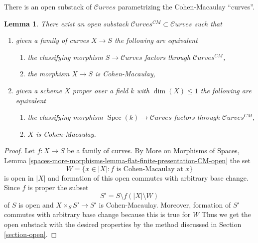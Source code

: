 \documentclass{stacks-project}
\theoremstyle{plain}
\newtheorem{lemma}[subsection]{Lemma}
\theoremstyle{definition}
\theoremstyle{remark}
\numberwithin{equation}{subsection}
\def\Spec{\mathop{\mathrm{Spec}}}
\def\Curvesstack{\mathcal{C}\!\mathit{urves}}
\begin{document}
\noindent
There is an open substack of $\Curvesstack$ parametrizing
the Cohen-Macaulay ``curves''.

\begin{lemma}
\label{lemma-CM-curves}
There exist an open substack $\Curvesstack^{CM} \subset \Curvesstack$
such that
\begin{enumerate}
\item given a family of curves $X \to S$ the following are equivalent
\begin{enumerate}
\item the classifying morphism $S \to \Curvesstack$ factors
through $\Curvesstack^{CM}$,
\item the morphism $X \to S$ is Cohen-Macaulay,
\end{enumerate}
\item given a scheme $X$ proper over a field $k$ with $\dim(X) \leq 1$
the following are equivalent
\begin{enumerate}
\item the classifying morphism $\Spec(k) \to \Curvesstack$ factors
through $\Curvesstack^{CM}$,
\item $X$ is Cohen-Macaulay.
\end{enumerate}
\end{enumerate}
\end{lemma}

\begin{proof}
Let $f : X \to S$ be a family of curves. By
More on Morphisms of Spaces, Lemma
\ref{spaces-more-morphisms-lemma-flat-finite-presentation-CM-open}
the set
$$
W = \{x \in |X| : f \text{ is Cohen-Macaulay at }x\}
$$
is open in $|X|$ and formation of this open commutes with arbitrary
base change. Since $f$ is proper the subset
$$
S' = S \setminus f(|X| \setminus W)
$$
of $S$ is open and $X \times_S S' \to S'$ is Cohen-Macaulay.
Moreover, formation of $S'$ commutes with arbitrary base
change because this is true for $W$
Thus we get the open substack with the desired properties
by the method discussed in Section \ref{section-open}.
\end{proof}
\end{document}
